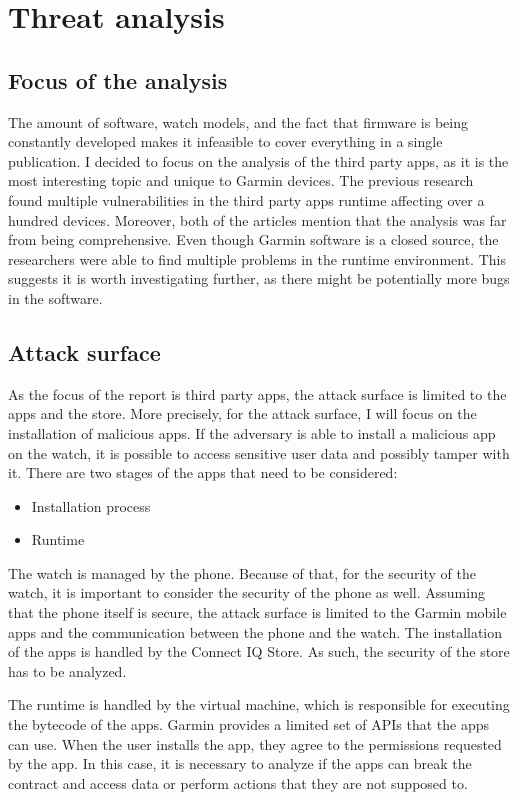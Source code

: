 \section{Threat analysis}
\subsection{Focus of the analysis}
The amount of software, watch models, and the fact that firmware is being constantly developed makes it infeasible to cover everything in a single publication.
I decided to focus on the analysis of the third party apps, as it is the most interesting topic and unique to Garmin devices.
The previous research found multiple vulnerabilities in the third party apps runtime affecting over a hundred devices\cite{broken-vm,compromising-garmin-watches}.
Moreover, both of the articles mention that the analysis was far from being comprehensive.
Even though Garmin software is a closed source, the researchers were able to find multiple problems in the runtime environment.
This suggests it is worth investigating further, as there might be potentially more bugs in the software.

\subsection{Attack surface}
As the focus of the report is third party apps, the attack surface is limited to the apps and the store.
More precisely, for the attack surface, I will focus on the installation of malicious apps.
If the adversary is able to install a malicious app on the watch, it is possible to access sensitive user data and possibly tamper with it.
There are two stages of the apps that need to be considered:
\begin{itemize}
    \item Installation process
    \item Runtime
\end{itemize}

The watch is managed by the phone.
Because of that, for the security of the watch, it is important to consider the security of the phone as well.
Assuming that the phone itself is secure, the attack surface is limited to the Garmin mobile apps and the communication between the phone and the watch.
The installation of the apps is handled by the Connect IQ Store.
As such, the security of the store has to be analyzed.

The runtime is handled by the virtual machine, which is responsible for executing the bytecode of the apps.
Garmin provides a limited set of APIs that the apps can use.
When the user installs the app, they agree to the permissions requested by the app.
In this case, it is necessary to analyze if the apps can break the contract and access data or perform actions that they are not supposed to.